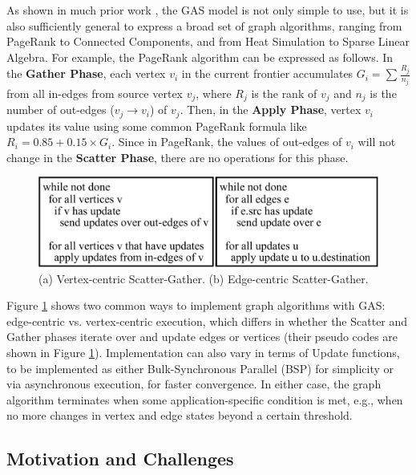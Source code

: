 As shown in much prior work \cite{powergraph, pregel, sc05}, the GAS model is not only simple to use, but it is also sufficiently general to express
a broad set of graph algorithms, ranging from PageRank to Connected Components, and from Heat Simulation to Sparse Linear Algebra. 
For example, the PageRank algorithm \cite{pagerank} can be expressed as follows. In the {\bf Gather Phase}, each vertex $v_i$ in the current 
frontier accumulates $G_i = \sum_{}^{}{\frac{R_j}{n_j}}$ from all in-edges from source vertex $v_j$, where $R_j$ is the rank of 
$v_j$ and $n_j$ is the number of out-edges ($v_j\rightarrow v_i$) of $v_j$. Then, in the {\bf Apply Phase}, vertex $v_i$ updates 
its value using some common PageRank formula like $R_i = 0.85+0.15\times G_i$. Since in PageRank, the values of out-edges of 	$v_i$ will not change 
in the {\bf Scatter Phase}, there are no operations for this phase. 


\begin{figure}[!t]
\centering
\includegraphics[width=\textwidth,height=\textheight,keepaspectratio]{figures/hybrid-model.pdf}
\caption{ (a) Vertex-centric Scatter-Gather. (b) Edge-centric Scatter-Gather. }
\label{fig:vertex-edge}
\end{figure}




Figure \ref{fig:vertex-edge} shows two common ways to implement graph algorithms with GAS: edge-centric vs. vertex-centric execution, which differs in whether the
Scatter and Gather phases iterate over and update edges or vertices (their pseudo codes are shown in Figure \ref{fig:vertex-edge}).
Implementation can also vary in terms of Update functions, to be implemented as either Bulk-Synchronous Parallel (BSP) \cite{BSP}
for simplicity or via asynchronous execution, for faster convergence. In either case, the graph algorithm terminates
when some application-specific condition is met, e.g., when no more changes in vertex and edge states beyond a certain threshold. 


\subsection{Motivation and Challenges}




